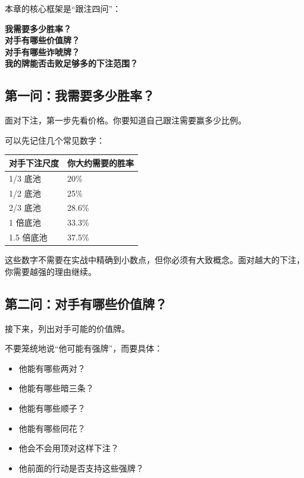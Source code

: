 本章的核心框架是“跟注四问”：

\begin{center}
\textbf{我需要多少胜率？\\
对手有哪些价值牌？\\
对手有哪些诈唬牌？\\
我的牌能否击败足够多的下注范围？}
\end{center}

\subsection{第一问：我需要多少胜率？}

面对下注，第一步先看价格。你要知道自己跟注需要赢多少比例。

可以先记住几个常见数字：

\begin{center}
\begin{tabular}{ll}
\toprule
\textbf{对手下注尺度} & \textbf{你大约需要的胜率} \\
\midrule
1/3 底池 & 20\% \\
1/2 底池 & 25\% \\
2/3 底池 & 28.6\% \\
1 倍底池 & 33.3\% \\
1.5 倍底池 & 37.5\% \\
\bottomrule
\end{tabular}
\end{center}

这些数字不需要在实战中精确到小数点，但你必须有大致概念。面对越大的下注，你需要越强的理由继续。

\subsection{第二问：对手有哪些价值牌？}

接下来，列出对手可能的价值牌。

不要笼统地说“他可能有强牌”，而要具体：

\begin{itemize}
\item 他能有哪些两对？
\item 他能有哪些暗三条？
\item 他能有哪些顺子？
\item 他能有哪些同花？
\item 他会不会用顶对这样下注？
\item 他前面的行动是否支持这些强牌？
\end{itemize}


